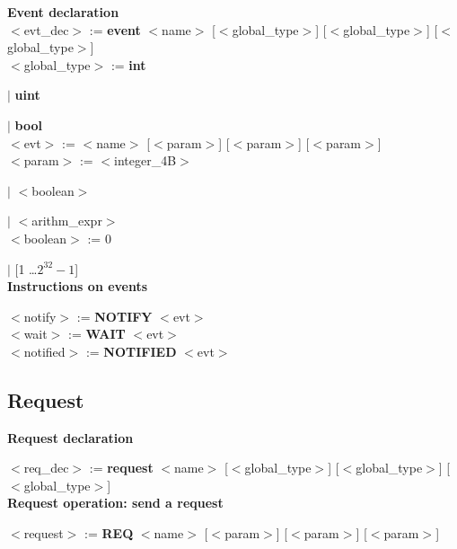 \documentclass[12pt]{article}
\begin{document}
\begin{onecolumn}
\textbf{Event declaration}\\

\noindent $<$evt\_dec$>$ := \textbf{event} $<$name$>$ [$<$global\_type$>$] [$<$global\_type$>$] [$<$global\_type$>$]\\

\indent $<$global\_type$>$ := \textbf{int} 

\indent \indent \indent \indent \indent \indent $|$ \textbf{uint}

\indent \indent \indent \indent \indent \indent $|$ \textbf{bool}\\

\noindent $<$evt$>$ := $<$name$>$ [$<$param$>$] [$<$param$>$] [$<$param$>$]\\

\indent $<$param$>$ := $<$integer\_4B$>$   

\indent \indent \indent \indent \indent $|$ $<$boolean$>$ 

\indent \indent \indent \indent \indent $|$ $<$arithm\_expr$>$\\    

\indent \indent $<$boolean$>$ := 0

\indent \indent \indent \indent \indent \indent $|$ [1 \ldots $2^{32}-1$] \\








\noindent \textbf{Instructions on events }

\noindent $<$notify$>$ := \textbf{NOTIFY} $<$evt$>$\\

\noindent $<$wait$>$ := \textbf{WAIT} $<$evt$>$\\

\noindent $<$notified$>$ := \textbf{NOTIFIED} $<$evt$>$\\

\subsection{Request}

\textbf{Request declaration}

\noindent $<$req\_dec$>$ := \textbf{request} $<$name$>$ [$<$global\_type$>$] [$<$global\_type$>$] [$<$global\_type$>$]\\

\noindent \textbf{Request operation: send a request}

\noindent $<$request$>$ := \textbf{REQ} $<$name$>$ [$<$param$>$] [$<$param$>$] [$<$param$>$]\\


\end{onecolumn}
\end{document}
